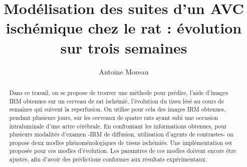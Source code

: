 \documentclass[a4paper,10pt]{article}
\title{Mod\'elisation des suites d'un AVC isch\'emique chez le rat : \'evolution sur trois semaines}
\author{Antoine Moreau}
\begin{document}
\maketitle

\begin{abstract}
Dans ce travail, on se propose de trouver une m\'ethode pour pr\'edire, %
 l'aide d'images IRM obtenues sur un cerveau de rat isch\'emi\'e, %
l'\'evolution du tissu l\'es\'e au cours de semaines qui suivent la reperfusion. %
%
On utilise pour cela des images IRM obtenues, pendant plusieurs jours, %
sur les cerveaux de quatre rats ayant subi une occusion intraluminale d'une artre c\'er\'ebrale. %
%
En confrontant les informations obtenues, pour plusieurs modalit\'es d'examen %
-IRM de diffusion, utilisation d'agents de contrastes- %
on propose deux modles ph\'enom\'enologiques de tissus isch\'emi\'es. %
%
Une impl\'ementation est propos\'ee pour ces modles d'\'evolution. %
%
Les paramtres de ces modles doivent encore \^etre ajust\'es, %
afin d'avoir des pr\'edictions conformes aux r\'esultats exp\'erimentaux.
\end{abstract}


%

%


%


%

%


\newpage


\end{document}
